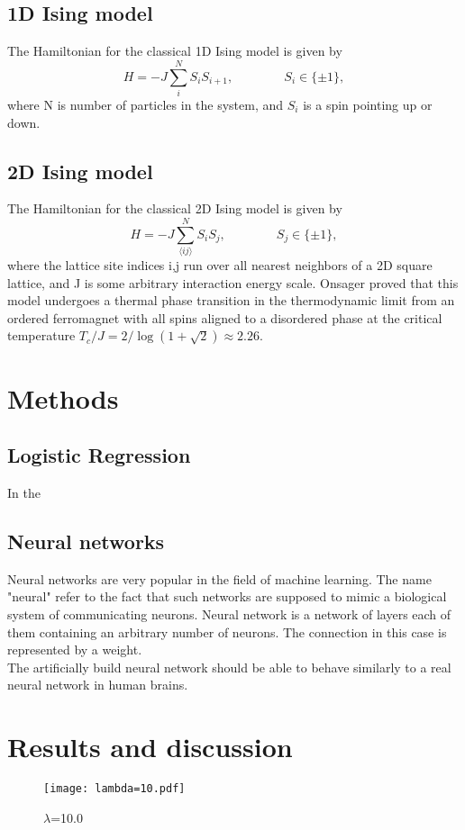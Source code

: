 \documentclass[10pt]{article}
\begin{document}
\subsection{1D Ising model}
The Hamiltonian for the classical 1D Ising model is given by
\begin{equation}
H = -J\sum_{i}^N S_{i}S_{i+1},\qquad \qquad S_i\in\{\pm 1\},
\end{equation}
where N is number of particles in the system, and $S_i$ is a spin pointing up or down. 

\subsection{2D Ising model}
The Hamiltonian for the classical 2D Ising model is given by
\begin{equation}
H = -J\sum_{\langle ij\rangle}^N S_{i}S_j,\qquad \qquad S_j\in\{\pm 1\},
\end{equation}
where the lattice site indices i,j run over all nearest neighbors of a 2D square lattice, and J is some arbitrary interaction energy scale. Onsager proved that this model undergoes a thermal phase transition in the thermodynamic limit from an ordered ferromagnet with all spins aligned to a disordered phase at the critical temperature  $T_c/J=2/\log(1+\sqrt{2})\approx 2.26$.
	
  

\section{Methods}

\subsection{Logistic Regression}
In the 
\subsection{Neural networks}
Neural networks are very popular in the field of machine learning. The name "neural" refer to the fact that such networks are supposed to mimic a biological system of communicating neurons. Neural network is a network of layers each of them containing an arbitrary number of neurons. The connection in this case is represented by a weight.\\
The artificially build neural network should be able to behave similarly to a real neural network in human brains.

\section{Results and discussion}
\begin{figure}
	\centerline{\texttt{[image: lambda=10.pdf]}}
	\caption{$\lambda$=10.0}
	\label{plt:lamda10}
\end{figure}
\end{document}
